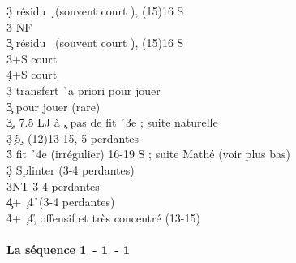 \documentclass[a4paper]{article}
\begin{document}
\begin{bidtable}
3\d \> résidu \d\ (souvent court \s ), (15)16 S\+\\
3\h \> NF\-\\
3\c \> résidu \s\ (souvent court \d ), (15)16 S\\
3\s {}+S court \s \\
4\d {}+S court \d \-\\
3\d \> transfert \h\ a priori pour jouer\\
3\c \> pour jouer (rare)\-\\
3\c {}, 7.5 LJ à \c , pas de fit \h\ 3e ; suite naturelle\\
3\d {}\c\ 5\d , (12)13-15, 5 perdantes\\
3\h \> fit \h\ 4e (irrégulier) 16-19 S ; suite Mathé (voir plus bas)\\
3\d \> Splinter (3-4 perdantes)\\
3NT  3-4 perdantes\\
4\c {}+ \c\ 4\h\ (3-4 perdantes)\\
4\h {}+ \c\ 4\h , offensif et très concentré (13-15)
\end{bidtable}

\paragraph{La séquence 1\pdfc\ - 1\pdfd\ - 1\pdfh}
\end{document}

